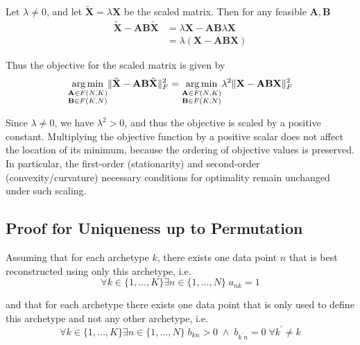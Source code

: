 \documentclass[oneside]{article}
\DeclareMathOperator*{\argmin}{arg\,min}
\begin{document}
Let $\lambda \neq 0$, and let $\tilde{\mathbf{X}} = \lambda \mathbf{X}$ be the scaled matrix. Then for any feasible $\mathbf{A}, \mathbf{B}$
\begin{equation}
    \begin{aligned}
    \tilde{\mathbf{X}} - \mathbf{A} \mathbf{B} \tilde{\mathbf{X}}
    &= \lambda \mathbf{X} - \mathbf{A} \mathbf{B} \lambda \mathbf{X} \\
    &= \lambda \left( \mathbf{X} - \mathbf{A} \mathbf{B} \mathbf{X} \right)
    \end{aligned}
\end{equation}

Thus the objective for the scaled matrix is given by
\begin{equation}
    \underset{\begin{subarray}{c} \mathbf{A} \in F(N, K) \\ \mathbf{B} \in F(K, N) \end{subarray}}{\argmin} \| \tilde{\mathbf{X}} - \mathbf{A} \mathbf{B} \tilde{\mathbf{X}} \|_F^2 = \underset{\begin{subarray}{c} \mathbf{A} \in F(N, K) \\ \mathbf{B} \in F(K, N) \end{subarray}}{\argmin} \lambda^2 \| \mathbf{X} - \mathbf{A} \mathbf{B} \mathbf{X} \|_F^2
\end{equation}

Since $\lambda \neq 0$, we have $\lambda^2 > 0$, and thus the objective is scaled by a positive constant. Multiplying the objective function by a positive scalar does not affect the location of its minimum, because the ordering of objective values is preserved. In particular, the first-order (stationarity) and second-order (convexity/curvature) necessary conditions for optimality remain unchanged under such scaling.

\subsection{Proof for Uniqueness up to Permutation}
\label{subsec:uniqueness}

Assuming that for each archetype $k$, there exists one data point $n$ that is best reconstructed using only this archetype, i.e.
\begin{equation}
    \label{eq:cond1_}
    \forall k \in \{1, ..., K\} \exists n \in \{1, ..., N\} \; a_{n k} = 1
\end{equation}

and that for each archetype there exists one data point that is only used to define this archetype and not any other archetype, i.e.
\begin{equation}
    \label{eq:cond2_}
    \forall k \in \{1, ..., K\} \exists n \in \{1, ..., N\} \; b_{k n} > 0 \; \land \; b_{k^\prime n} = 0 \; \forall k^\prime \neq k
\end{equation}
\end{document}
